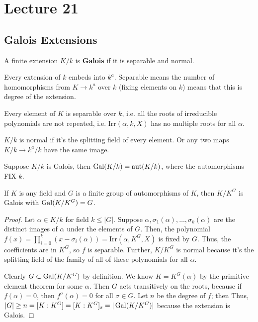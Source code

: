 \section{Lecture 21}
\subsection{Galois Extensions}
\begin{definition}
    A finite extension $K/k$ is \textbf{Galois} if it is separable and normal.
\end{definition}
Every extension of $k$ embeds into $k^a$. Separable means the number of homomorphisms
from $K \to k^a$ over $k$ (fixing elements on $k$) means that this is degree of the extension.

Every element of $K$ is separable over $k$, i.e. all the roots of irreducible
polynomials are not repeated, i.e. $\text{Irr}(\alpha, k, X)$ has no multiple roots for all $\alpha$.

$K/k$ is normal if it's the splitting field of every element. Or any two maps $K/k \to k^a/k$ have the same image.

\begin{definition}
    Suppose $K/k$ is Galois, then $\operatorname{Gal}(K/k) = \operatorname{aut}(K/k)$, where the automorphisms FIX $k$.
\end{definition}

\begin{theorem}
    If $K$ is any field and $G$ is a finite group of automorphisms of $K$,
    then $K/K^G$ is Galois with $\operatorname{Gal}(K/K^G) = G$.
    \begin{proof}
        Let $\alpha \in K/k$ for field $k \le |G|$. Suppose $\alpha, \sigma_1(\alpha), \dots, \sigma_k(\alpha)$
        are the distinct images of $\alpha$ under the elements of $G$. Then,
        the polynomial $f(x) = \prod_{i = 0}^{k}(x - \sigma_i(\alpha)) = \text{Irr}(\alpha, K^G, X)$ is fixed by $G$.
        Thus, the coefficients are in $K^G$, so $f$ is separable.
         Further, $K/K^G$
        is normal because it's the splitting field of the family of all of these polynomials for all $\alpha$.

        Clearly $G \subset \operatorname{Gal}(K/K^G)$ by definition.
        We know $K = K^G(\alpha)$ by the primitive element theorem for some $\alpha$. Then
        $G$ acts transitively on the roots, because if $f(\alpha) = 0$, then $f^\sigma(\alpha) = 0$
        for all $\sigma \in G$. Let $n$ be the degree of $f$; then
        Thus, $|G| \ge n = [K: K^G] = [K: K^G]_s = |\operatorname{Gal}(K/K^G)|$ because the extension is Galois.
    \end{proof}
\end{theorem}

